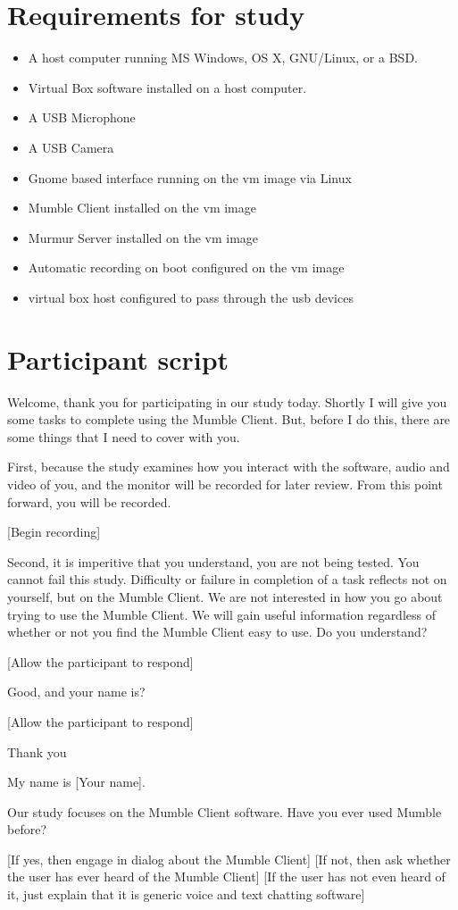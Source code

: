 \documentclass{article}
\begin{document}
    \section{Requirements for study}
    \begin{itemize}
        \item A host computer running MS Windows, OS X, GNU/Linux, or a BSD.
        \item Virtual Box software installed on a host computer.
        \item A USB Microphone
        \item A USB Camera
        \item Gnome based interface running on the vm image via Linux
        \item Mumble Client installed on the vm image
        \item Murmur Server installed on the vm image
        \item Automatic recording  on boot configured on the vm image
        \item virtual box host configured to pass through the usb devices
    \end{itemize}
    \section{Participant script}
    Welcome, thank you for participating in our study today. Shortly I will
    give you some tasks to complete using the Mumble Client. But, before I
    do this, there are some things that I need to cover with you.

    First, because the study examines how you interact with the software,
    audio and video of you, and the monitor will be recorded for later
    review. From this point forward, you will be recorded.

    [Begin recording]

    Second, it is imperitive that you understand, you are not being tested.
    You cannot fail this study. Difficulty or failure in completion of a
    task reflects not on yourself, but on the Mumble Client. We are not
    interested in how you go about trying to use the Mumble Client. We will
    gain useful information regardless of whether or not you find the Mumble
    Client easy to use. Do you understand?

    [Allow the participant to respond]

    Good, and your name is?

    [Allow the participant to respond]

    Thank you

    My name is [Your name].

    Our study focuses on the Mumble Client software. Have you ever used Mumble before?

    [If yes, then engage in dialog about the Mumble Client]
    [If not, then ask whether the user has ever heard of the Mumble Client]
    [If the user has not even heard of it, just explain that it is generic voice and text chatting software]
\end{document}
